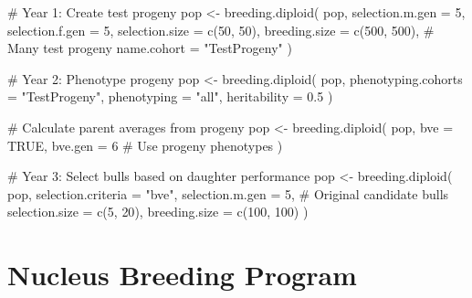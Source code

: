 \documentclass[
  letterpaper,
]{book}
\newenvironment{Shaded}{\begin{snugshade}}{\end{snugshade}}
\newcommand{\AttributeTok}[1]{\textcolor[rgb]{0.40,0.45,0.13}{#1}}
\newcommand{\CommentTok}[1]{\textcolor[rgb]{0.37,0.37,0.37}{#1}}
\newcommand{\ConstantTok}[1]{\textcolor[rgb]{0.56,0.35,0.01}{#1}}
\newcommand{\DecValTok}[1]{\textcolor[rgb]{0.68,0.00,0.00}{#1}}
\newcommand{\FloatTok}[1]{\textcolor[rgb]{0.68,0.00,0.00}{#1}}
\newcommand{\FunctionTok}[1]{\textcolor[rgb]{0.28,0.35,0.67}{#1}}
\newcommand{\NormalTok}[1]{\textcolor[rgb]{0.00,0.23,0.31}{#1}}
\newcommand{\OtherTok}[1]{\textcolor[rgb]{0.00,0.23,0.31}{#1}}
\newcommand{\StringTok}[1]{\textcolor[rgb]{0.13,0.47,0.30}{#1}}
\begin{document}
\begin{Shaded}
\begin{Highlighting}[]
\CommentTok{\# Year 1: Create test progeny}
\NormalTok{pop }\OtherTok{\textless{}{-}} \FunctionTok{breeding.diploid}\NormalTok{(}
\NormalTok{  pop,}
  \AttributeTok{selection.m.gen =} \DecValTok{5}\NormalTok{,}
  \AttributeTok{selection.f.gen =} \DecValTok{5}\NormalTok{,}
  \AttributeTok{selection.size =} \FunctionTok{c}\NormalTok{(}\DecValTok{50}\NormalTok{, }\DecValTok{50}\NormalTok{),}
  \AttributeTok{breeding.size =} \FunctionTok{c}\NormalTok{(}\DecValTok{500}\NormalTok{, }\DecValTok{500}\NormalTok{),    }\CommentTok{\# Many test progeny}
  \AttributeTok{name.cohort =} \StringTok{"TestProgeny"}
\NormalTok{)}

\CommentTok{\# Year 2: Phenotype progeny}
\NormalTok{pop }\OtherTok{\textless{}{-}} \FunctionTok{breeding.diploid}\NormalTok{(}
\NormalTok{  pop,}
  \AttributeTok{phenotyping.cohorts =} \StringTok{"TestProgeny"}\NormalTok{,}
  \AttributeTok{phenotyping =} \StringTok{"all"}\NormalTok{,}
  \AttributeTok{heritability =} \FloatTok{0.5}
\NormalTok{)}

\CommentTok{\# Calculate parent averages from progeny}
\NormalTok{pop }\OtherTok{\textless{}{-}} \FunctionTok{breeding.diploid}\NormalTok{(}
\NormalTok{  pop,}
  \AttributeTok{bve =} \ConstantTok{TRUE}\NormalTok{,}
  \AttributeTok{bve.gen =} \DecValTok{6}  \CommentTok{\# Use progeny phenotypes}
\NormalTok{)}

\CommentTok{\# Year 3: Select bulls based on daughter performance}
\NormalTok{pop }\OtherTok{\textless{}{-}} \FunctionTok{breeding.diploid}\NormalTok{(}
\NormalTok{  pop,}
  \AttributeTok{selection.criteria =} \StringTok{"bve"}\NormalTok{,}
  \AttributeTok{selection.m.gen =} \DecValTok{5}\NormalTok{,      }\CommentTok{\# Original candidate bulls}
  \AttributeTok{selection.size =} \FunctionTok{c}\NormalTok{(}\DecValTok{5}\NormalTok{, }\DecValTok{20}\NormalTok{),}
  \AttributeTok{breeding.size =} \FunctionTok{c}\NormalTok{(}\DecValTok{100}\NormalTok{, }\DecValTok{100}\NormalTok{)}
\NormalTok{)}
\end{Highlighting}
\end{Shaded}

\section{Nucleus Breeding Program}\label{nucleus-breeding-program}
\end{document}
